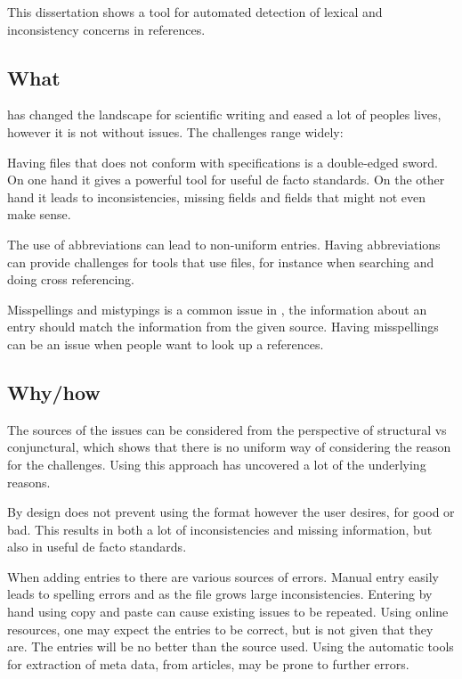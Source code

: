 
This dissertation shows a tool for automated detection of lexical and
inconsistency concerns in {\bibtex} references.

\subsection{What }

{\bibtex} has changed the landscape for scientific writing and eased a
lot of peoples lives, however it is not without issues.  The
challenges range widely:

Having files that does not conform with specifications is a
double-edged sword.  On one hand it gives a powerful tool for useful
de facto standards.  On the other hand it leads to inconsistencies,
missing fields and fields that might not even make sense.

The use of abbreviations can lead to non-uniform entries.  Having
abbreviations can provide challenges for tools that use {\bibtex}
files, for instance when searching and doing cross referencing.

Misspellings and mistypings is a common issue in {\bibtex}, the
information about an entry should match the information from the given
source.  Having misspellings can be an issue when people want to look
up a references.


\subsection{Why/how }

The sources of the issues can be considered from the perspective of
structural vs conjunctural, which shows that there is no uniform way
of considering the reason for the challenges.  Using this approach has
uncovered a lot of the underlying reasons.

By design {\bibtex} does not prevent using the format however the user
desires, for good or bad.  This results in both a lot of
inconsistencies and missing information, but also in useful de facto
standards.

When adding entries to {\bibtex} there are various sources of errors.
Manual entry easily leads to spelling errors and as the file grows
large inconsistencies.  Entering by hand using copy and paste can
cause existing issues to be repeated.  Using online resources, one may
expect the entries to be correct, but is not given that they are.  The
entries will be no better than the source used.  Using the automatic
tools for extraction of meta data, from articles, may be prone to
further errors.

